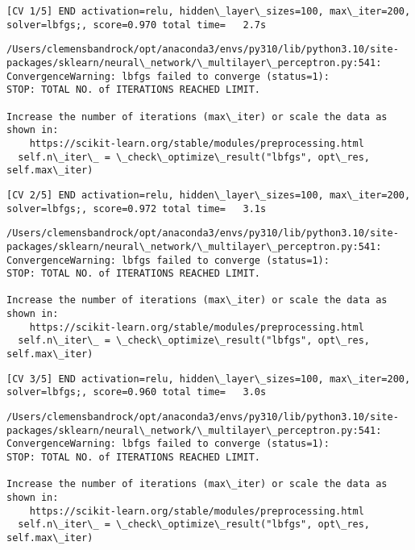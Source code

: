\documentclass[11pt]{article}
\begin{document}
    \begin{Verbatim}[commandchars=\\\{\}]
[CV 1/5] END activation=relu, hidden\_layer\_sizes=100, max\_iter=200,
solver=lbfgs;, score=0.970 total time=   2.7s
    \end{Verbatim}

    \begin{Verbatim}[commandchars=\\\{\}]
/Users/clemensbandrock/opt/anaconda3/envs/py310/lib/python3.10/site-
packages/sklearn/neural\_network/\_multilayer\_perceptron.py:541:
ConvergenceWarning: lbfgs failed to converge (status=1):
STOP: TOTAL NO. of ITERATIONS REACHED LIMIT.

Increase the number of iterations (max\_iter) or scale the data as shown in:
    https://scikit-learn.org/stable/modules/preprocessing.html
  self.n\_iter\_ = \_check\_optimize\_result("lbfgs", opt\_res, self.max\_iter)
    \end{Verbatim}

    \begin{Verbatim}[commandchars=\\\{\}]
[CV 2/5] END activation=relu, hidden\_layer\_sizes=100, max\_iter=200,
solver=lbfgs;, score=0.972 total time=   3.1s
    \end{Verbatim}

    \begin{Verbatim}[commandchars=\\\{\}]
/Users/clemensbandrock/opt/anaconda3/envs/py310/lib/python3.10/site-
packages/sklearn/neural\_network/\_multilayer\_perceptron.py:541:
ConvergenceWarning: lbfgs failed to converge (status=1):
STOP: TOTAL NO. of ITERATIONS REACHED LIMIT.

Increase the number of iterations (max\_iter) or scale the data as shown in:
    https://scikit-learn.org/stable/modules/preprocessing.html
  self.n\_iter\_ = \_check\_optimize\_result("lbfgs", opt\_res, self.max\_iter)
    \end{Verbatim}

    \begin{Verbatim}[commandchars=\\\{\}]
[CV 3/5] END activation=relu, hidden\_layer\_sizes=100, max\_iter=200,
solver=lbfgs;, score=0.960 total time=   3.0s
    \end{Verbatim}

    \begin{Verbatim}[commandchars=\\\{\}]
/Users/clemensbandrock/opt/anaconda3/envs/py310/lib/python3.10/site-
packages/sklearn/neural\_network/\_multilayer\_perceptron.py:541:
ConvergenceWarning: lbfgs failed to converge (status=1):
STOP: TOTAL NO. of ITERATIONS REACHED LIMIT.

Increase the number of iterations (max\_iter) or scale the data as shown in:
    https://scikit-learn.org/stable/modules/preprocessing.html
  self.n\_iter\_ = \_check\_optimize\_result("lbfgs", opt\_res, self.max\_iter)
    \end{Verbatim}
\end{document}
